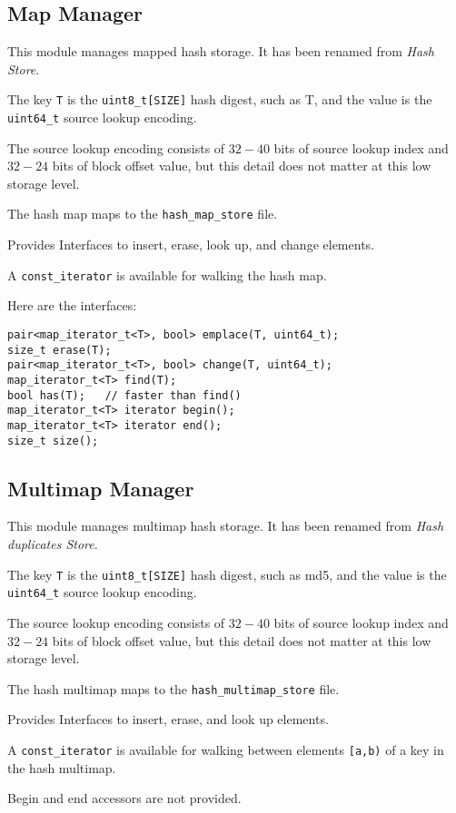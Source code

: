 \documentclass[12pt,twoside]{article}
\begin{document}
\subsection{Map Manager}
This module manages mapped hash storage.
It has been renamed from \textit{Hash Store}.
\begin{compactitem}
\item The key \texttt{T} is the \texttt{uint8\_t[SIZE]} hash digest,
such as T,
and the value is the \texttt{uint64\_t} source lookup encoding.
\item The source lookup encoding consists of $32-40$ bits
of source lookup index and $32-24$ bits of block offset value,
but this detail does not matter at this low storage level.
\item The hash map maps to the \texttt{hash\_map\_store} file.
\item Provides Interfaces to insert, erase, look up, and change elements.
\item A \texttt{const\_iterator} is available for walking the hash map.
\end{compactitem}

Here are the interfaces:
\begin{small}
\begin{verbatim}
pair<map_iterator_t<T>, bool> emplace(T, uint64_t);
size_t erase(T);
pair<map_iterator_t<T>, bool> change(T, uint64_t);
map_iterator_t<T> find(T);
bool has(T);   // faster than find()
map_iterator_t<T> iterator begin();
map_iterator_t<T> iterator end();
size_t size();
\end{verbatim}
\end{small}

\subsection{Multimap Manager}
This module manages multimap hash storage.
It has been renamed from \textit{Hash duplicates Store}.
\begin{compactitem}
\item The key \texttt{T} is the \texttt{uint8\_t[SIZE]} hash digest,
such as md5,
and the value is the \texttt{uint64\_t} source lookup encoding.
\item The source lookup encoding consists of $32-40$ bits
of source lookup index and $32-24$ bits of block offset value,
but this detail does not matter at this low storage level.
\item The hash multimap maps to the \texttt{hash\_multimap\_store} file.
\item Provides Interfaces to insert, erase, and look up elements.
\item A \texttt{const\_iterator} is available for walking
between elements \texttt{[a,b)} of a key in the hash multimap.
\item Begin and end accessors are not provided.
\end{compactitem}
\end{document}
